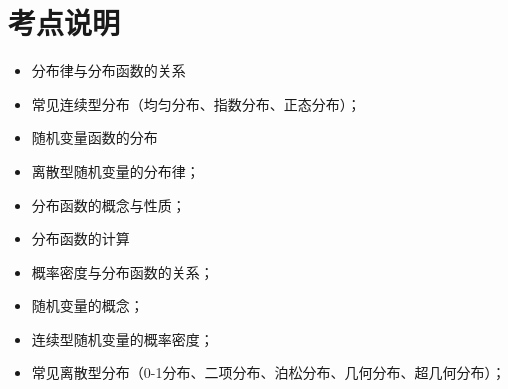 \section{考点说明}
\begin{itemize}
\item 分布律与分布函数的关系
\item 常见连续型分布（均匀分布、指数分布、正态分布）；
\item 随机变量函数的分布
\item 离散型随机变量的分布律；
\item 分布函数的概念与性质；
\item 分布函数的计算
\item 概率密度与分布函数的关系；
\item 随机变量的概念；
\item 连续型随机变量的概率密度；
\item 常见离散型分布（0-1分布、二项分布、泊松分布、几何分布、超几何分布）；
\end{itemize}

